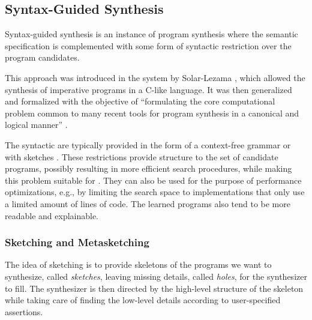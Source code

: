 \subsection{Syntax-Guided Synthesis}
\label{sec:sygus}


Syntax-guided synthesis is an instance of program synthesis where the semantic
specification is complemented with some form of syntactic restriction over the
program candidates.

This approach was introduced in the  system by Solar-Lezama \cite{Solar-Lezama:2008}, which allowed the
synthesis of imperative programs in a C-like language.
It was then generalized and formalized with the objective of ``formulating the
core computational problem common to many recent tools for program synthesis in
a canonical and logical manner'' \cite{Alur:sygus:2013}.

The syntactic  are typically provided
in the form of a context-free grammar \cite{Alur:sygus:2013} or with sketches
\cite{Solar-Lezama:2008}. These restrictions provide structure to the set of
candidate programs, possibly resulting in more efficient search procedures,
while making this problem suitable for  \cite{Alur:sygus:2013}. They can also be used for
the purpose of performance optimizations, e.g., by limiting the search space to
implementations that only use a limited amount of lines of code. The learned
programs also tend to be more readable and explainable.


\subsubsection{Sketching and Metasketching}
\label{sec:sketching}


The idea of sketching is to provide skeletons of the programs we want to
synthesize, called \textit{sketches}, leaving missing details, called
\textit{holes}, for the synthesizer to fill.
The synthesizer is then directed by the high-level structure of the skeleton
while taking care of finding the low-level details according to user-specified
assertions.

